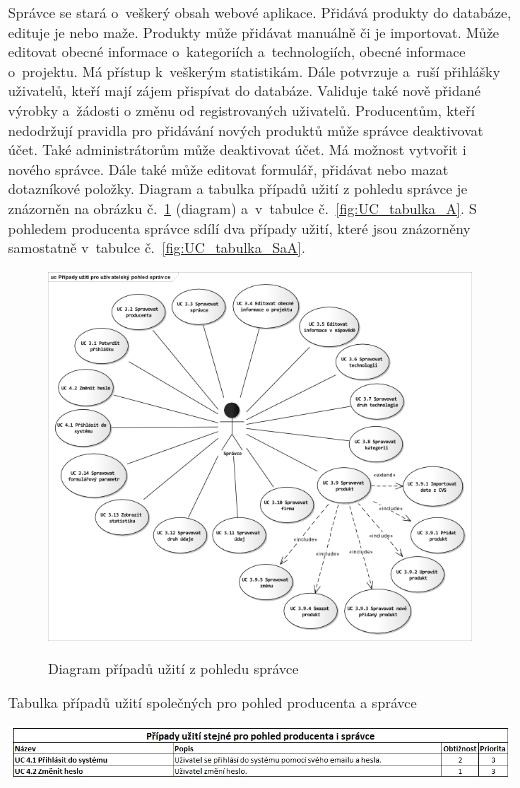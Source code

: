 \documentclass[11pt,a4paper]{article}
\newcounter{subsubsubsection}
\begin{document}
Správce se stará o~veškerý obsah webové aplikace. Přidává produkty do databáze, edituje je nebo maže. Produkty může přidávat manuálně či je importovat. Může editovat obecné informace o~kategoriích a~technologiích, obecné informace o~projektu. Má přístup k~veškerým statistikám. Dále potvrzuje a~ruší přihlášky uživatelů, kteří mají zájem přispívat do databáze. Validuje také nově přidané výrobky a~žádosti o změnu od registrovaných uživatelů. Producentům, kteří nedodržují pravidla pro přidávání nových produktů může správce deaktivovat účet. Také administrátorům může deaktivovat účet. Má možnost vytvořit i nového správce. Dále také může editovat formulář, přidávat nebo mazat dotazníkové položky. Diagram a tabulka případů užití z pohledu správce je znázorněn na obrázku č.~\ref{fig:UC_diagram_A} (diagram) a~v~tabulce č.~\ref{fig:UC_tabulka_A}. S pohledem producenta správce sdílí dva případy užití, které jsou znázorněny samostatně v~tabulce č.~\ref{fig:UC_tabulka_SaA}. 

\begin{figure}[H] 
\centering 
\caption{Diagram případů užití z pohledu správce} 
\vspace{0.1cm} 
\includegraphics[scale=0.9]{vize_DTOZE_UC_dg3_n} 
\label{fig:UC_diagram_A}
\end{figure} 
 
\begin{table}[H] 
\centering 
\caption{Tabulka případů užití společných pro pohled producenta a správce} 
\includegraphics[scale=0.5]{vize_DTOZE_UC_4} 
\label{fig:UC_tabulka_SaA}
\end{table}
\end{document}
